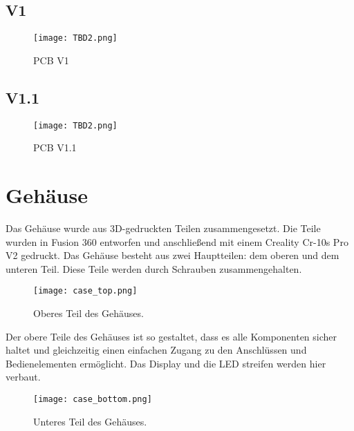         \subsection{V1}

            \begin{figure}[h!]
                \centering
                \texttt{[image: TBD2.png]}
                \caption{PCB V1}
                \label{fig:pcb1}

            \end{figure}

        \subsection{V1.1}

            \begin{figure}[h!]
                \centering
                \texttt{[image: TBD2.png]}
                \caption{PCB V1.1}
                \label{fig:pcb2}

            \end{figure}
            
        
    \newpage
    \section{Gehäuse}
    Das Gehäuse wurde aus 3D-gedruckten Teilen zusammengesetzt. Die Teile wurden in Fusion 360 
    entworfen und anschließend mit einem Creality Cr-10s Pro V2 gedruckt. Das Gehäuse besteht aus zwei 
    Hauptteilen: dem oberen und dem unteren Teil. Diese Teile werden durch Schrauben zusammengehalten.

        \begin{figure}[h!]
            \centering
            \texttt{[image: case\_top.png]}
            \caption{Oberes Teil des Gehäuses.}
            \label{fig:case_top}
        \end{figure}

    Der obere Teile des Gehäuses ist so gestaltet, dass es alle Komponenten sicher 
    haltet und gleichzeitig einen einfachen Zugang zu den Anschlüssen und Bedienelementen ermöglicht.
    Das Display und die LED streifen werden hier verbaut. 

        \begin{figure}[h!]
            \centering
            \texttt{[image: case\_bottom.png]}
            \caption{Unteres Teil des Gehäuses.}
            \label{fig:case_bottom}
        \end{figure}

